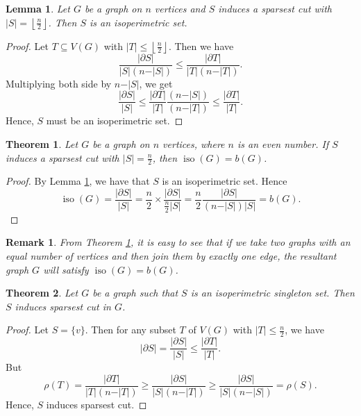 \documentclass[12pt]{article}
\newtheorem{theorem}{Theorem}[section]
\newtheorem{lemma}{Lemma}[section]
\newtheorem{remark}{Remark}[section]
\DeclareMathOperator{\iso}{iso}
\begin{document}
\begin{lemma}
    
\label{iso(G)=b(g) lemma}
    Let $G$ be a graph on $n$ vertices and $S$ induces a sparsest cut with $ \vert S \vert=\left\lfloor \frac{n}{2} \right\rfloor$. Then $S$ is an isoperimetric set.
\end{lemma}
\begin{proof}
    Let $T \subseteq V(G)$ with $\vert T \vert \leq \left\lfloor \frac{n}{2} \right\rfloor$. Then we have  $$\frac{\vert{\partial S}\vert}{\vert S\vert (n-\vert S \vert)} \leq \frac{\vert {\partial T}\vert}{\vert T\vert(n- \vert T\vert)}.$$ Multiplying both side by $n- \vert S \vert$, we get
    $$
\frac{\vert{\partial S}\vert}{ \vert S \vert } \leq \frac{\vert \partial T \vert}{\vert T \vert} \frac{(n- \vert S \vert)}{(n- \vert T \vert)} \leq \frac{\vert \partial T \vert}{\vert T \vert}.
    $$
     Hence, $S$ must be an isoperimetric set.
\end{proof}
\begin{theorem}\label{iso(G)=b(G)}
    Let $G$ be a graph on $n$ vertices, where $n$ is an even number. If $S$ induces a sparsest cut with $ \vert S \vert= \frac{n}{2} $, then $\iso(G)=b(G)$. 
\end{theorem}
\begin{proof}
    By Lemma \ref{iso(G)=b(g) lemma}, we have that $S$ is an isoperimetric set. Hence
    $$
\iso(G)=\frac{\vert{\partial S}\vert}{|S|}=\frac{n}{2} \times \frac{\vert\partial S \vert}{\frac{n}{2}\vert S \vert}=\frac{n}{2} \frac{\vert\partial S \vert}{ (n - \vert S \vert)\vert S \vert}=b(G).
    $$
\end{proof}
\begin{remark}
    From Theorem \ref{iso(G)=b(G)}, it is easy to see that if we take two graphs with an equal number of vertices and then join them by exactly one edge, the resultant graph $G$ will satisfy $\iso(G)=b(G)$. 
\end{remark}
\begin{theorem}
Let $G$ be a graph such that $S$ is an isoperimetric singleton set. Then $S$ induces sparsest cut in $G$.
\end{theorem}
\begin{proof}
Let $S=\{v\}$. Then for any subset $T$ of $V(G)$ with $|T| \leq \frac{n}{2}$, we have
$$
\vert \partial S \vert=\frac{\vert\partial S\vert}{\vert S \vert}\leq \frac{\vert \partial T \vert}{\vert T \vert}.
$$
But
$$
\rho(T)=\frac{\vert {\partial T}\vert}{\vert T\vert(n- \vert T\vert)} \geq \frac{\vert{\partial S}\vert}{\vert S \vert (n-\vert T \vert)} \geq \frac{\vert{\partial S}\vert}{|S|(n-\vert S \vert)}=\rho(S).
$$
Hence, $S$ induces sparsest cut.
\end{proof}
\end{document}
